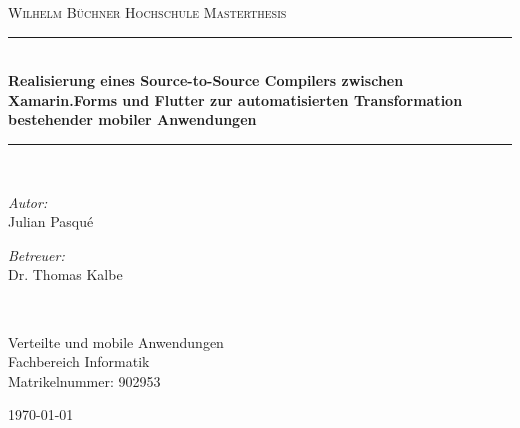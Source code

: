 \begin{titlepage}
\begin{center}
\newcommand{\HRule}{\rule{.9\linewidth}{.6pt}} %

\vspace*{.06\textheight}
{\scshape\LARGE Wilhelm Büchner Hochschule}\vspace{1.5cm} %
\textsc{\Large Masterthesis}\\[0.5cm] %

\HRule \\[0.4cm] %


\Large\textbf{Realisierung eines Source-to-Source Compilers zwischen Xamarin.Forms und Flutter zur automatisierten Transformation bestehender mobiler 
Anwendungen}\par


\HRule \\[1.5cm] %
 
\begin{minipage}[t]{0.4\textwidth}
\begin{flushleft} \large
\emph{Autor:}\\
Julian Pasqué %
\end{flushleft}
\end{minipage}
\begin{minipage}[t]{0.4\textwidth}
\begin{flushright} \large
\emph{Betreuer:} \\
Dr. Thomas Kalbe %
\end{flushright}
\end{minipage}\\[3cm]
 
\vfill


\large Verteilte und mobile Anwendungen\\[0.8cm] %
\large Fachbereich Informatik\\[0.8cm] %
\large Matrikelnummer: 902953 \\[0.8cm] %
 
\vfill

{\large \today}\\[6cm] %
 
\vfill
\end{center}
\end{titlepage}